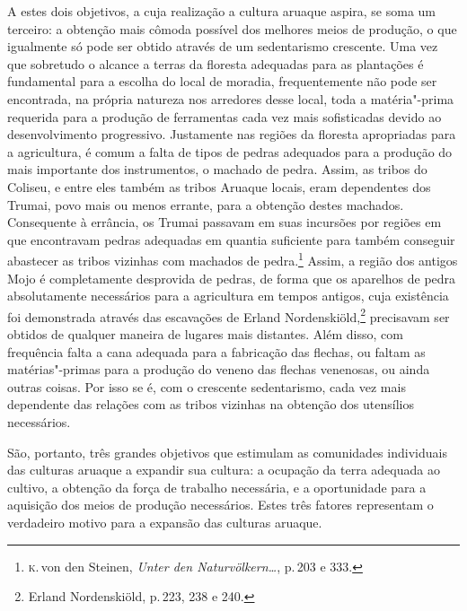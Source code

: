 A estes dois objetivos, a cuja realização a cultura aruaque aspira, se
soma um terceiro: a obtenção mais cômoda possível dos melhores 
meios de produção, o que igualmente só pode
ser obtido através de um sedentarismo crescente. Uma vez que sobretudo
o alcance a terras da floresta adequadas para as plantações é
fundamental para a escolha do local de moradia, frequentemente não pode
ser encontrada, na própria natureza nos arredores desse local, toda a
matéria"-prima requerida para a produção de ferramentas cada vez mais
sofisticadas devido ao desenvolvimento progressivo. Justamente nas
regiões da floresta apropriadas para a agricultura, é comum a falta de tipos 
de pedras adequados para a produção do mais importante dos instrumentos, o machado de pedra. 
Assim, as tribos do Coliseu, e
entre eles também as tribos Aruaque locais, eram dependentes dos Trumai, povo mais ou
menos errante, para a
obtenção destes machados. Consequente à errância, os Trumai passavam em suas incursões por regiões em que
encontravam pedras adequadas em quantia suficiente para também conseguir
abastecer as tribos vizinhas com machados de pedra.\footnote{\textsc{k}.\,von den
  Steinen, \textit{Unter den Naturvölkern\ldots}, p.\,203 e
  333.} Assim, a região dos antigos Mojo é completamente desprovida de
pedras, de forma que os aparelhos de pedra absolutamente necessários
para a agricultura em tempos antigos, cuja existência foi demonstrada
através das escavações de Erland Nordenskiöld,\footnote{Erland
  Nordenskiöld, p.\,223, 238 e 240.} precisavam ser obtidos de
qualquer maneira de lugares mais distantes. Além disso, com frequência
falta a cana adequada para a fabricação das flechas, ou faltam as
matérias"-primas para a produção do veneno das flechas venenosas, ou
ainda outras coisas. Por isso se é, com o crescente sedentarismo, cada
vez mais dependente das relações com as tribos vizinhas na obtenção dos
utensílios necessários.

São, portanto, três grandes objetivos que estimulam as comunidades
individuais das culturas aruaque a expandir sua cultura: a ocupação da
terra adequada ao cultivo, a obtenção da força de trabalho necessária, e
a oportunidade para a aquisição dos meios de produção necessários. Estes
três fatores representam o verdadeiro motivo para a expansão das
culturas aruaque.

